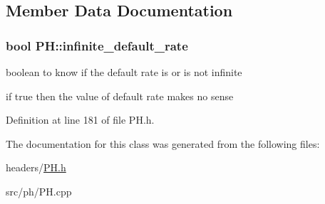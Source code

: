 \subsection{Member Data Documentation}
\hypertarget{classPH_aa66efaf095a379c3b108a023d7c98afa}{
\subsubsection[{infinite\+\_\+default\+\_\+rate}]{\setlength{\rightskip}{0pt plus 5cm}bool P\+H\+::infinite\+\_\+default\+\_\+rate\hspace{0.3cm}{\ttfamily [protected]}}}\label{classPH_aa66efaf095a379c3b108a023d7c98afa}


boolean to know if the default rate is or is not infinite 

if true then the value of default rate makes no sense 

Definition at line 181 of file P\+H.\+h.



The documentation for this class was generated from the following files\+:\begin{DoxyCompactItemize}
\item 
headers/\hyperlink{PH_8h}{P\+H.\+h}\item 
src/ph/P\+H.\+cpp\end{DoxyCompactItemize}
